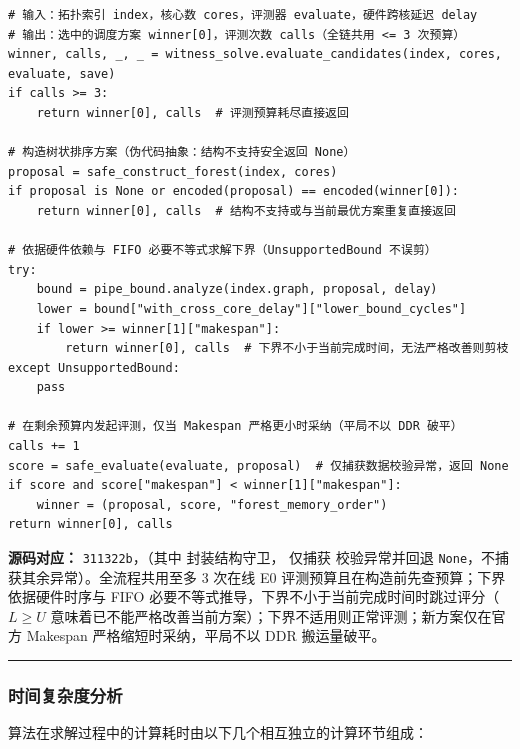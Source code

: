 \documentclass[anonymous,withtoc]{gmcm2026}
\begin{document}
\begin{lstlisting}[style=paperpseudo]
# 输入：拓扑索引 index，核心数 cores，评测器 evaluate，硬件跨核延迟 delay
# 输出：选中的调度方案 winner[0]，评测次数 calls（全链共用 <= 3 次预算）
winner, calls, _, _ = witness_solve.evaluate_candidates(index, cores, evaluate, save)
if calls >= 3:
    return winner[0], calls  # 评测预算耗尽直接返回

# 构造树状排序方案（伪代码抽象：结构不支持安全返回 None）
proposal = safe_construct_forest(index, cores)
if proposal is None or encoded(proposal) == encoded(winner[0]):
    return winner[0], calls  # 结构不支持或与当前最优方案重复直接返回

# 依据硬件依赖与 FIFO 必要不等式求解下界（UnsupportedBound 不误剪）
try:
    bound = pipe_bound.analyze(index.graph, proposal, delay)
    lower = bound["with_cross_core_delay"]["lower_bound_cycles"]
    if lower >= winner[1]["makespan"]:
        return winner[0], calls  # 下界不小于当前完成时间，无法严格改善则剪枝
except UnsupportedBound:
    pass

# 在剩余预算内发起评测，仅当 Makespan 严格更小时采纳（平局不以 DDR 破平）
calls += 1
score = safe_evaluate(evaluate, proposal)  # 仅捕获数据校验异常，返回 None
if score and score["makespan"] < winner[1]["makespan"]:
    winner = (proposal, score, "forest_memory_order")
return winner[0], calls
\end{lstlisting}
\textbf{源码对应：} \texttt{311322b}，\texttt{}（其中 \texttt{} 封装结构守卫，\texttt{} 仅捕获 \texttt{} 校验异常并回退 \texttt{None}，不捕获其余异常）。全流程共用至多 3 次在线 E0 评测预算且在构造前先查预算；下界依据硬件时序与 FIFO 必要不等式推导，下界不小于当前完成时间时跳过评分（\(L \ge U\) 意味着已不能严格改善当前方案）；下界不适用则正常评测；新方案仅在官方 Makespan 严格缩短时采纳，平局不以 DDR 搬运量破平。

\par\hrule\endgroup

\subsubsection{时间复杂度分析}

算法在求解过程中的计算耗时由以下几个相互独立的计算环节组成：
\end{document}
